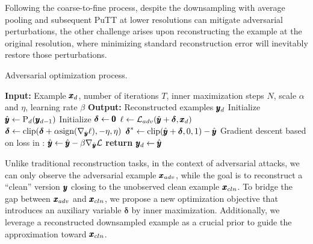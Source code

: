 Following the coarse-to-fine process, despite the downsampling with average pooling and subsequent PuTT at lower resolutions can mitigate adversarial perturbations, the other challenge arises upon reconstructing the example at the original resolution, where minimizing standard reconstruction error will inevitably restore those perturbations.

\begin{table}[t]
\centering
\vskip -0.1in
\begin{minipage}{\linewidth}
\begin{algorithm}[H]
    \caption{Adversarial optimization process.}
    \label{alg:ours}
    \begin{algorithmic}
        \STATE \textbf{Input:} Example $\pmb{x}_d$, number of iterations $T$, inner maximization steps $N$, scale $\alpha$ and $\eta$, learning rate $\beta$
        \STATE \textbf{Output:} Reconstructed examples $\pmb{y}_d$
        \STATE Initialize $\hat{\pmb{y}} \gets \text{P}_{d}(\pmb{y}_{d-1})$
        \STATE Initialize \( \boldsymbol{\delta} \leftarrow \pmb{0} \)
        \STATE $\ell \gets \mathcal{L}_{adv}(\hat{\pmb{y}} + \boldsymbol{\delta}, \pmb{x}_d)$
        \STATE $\boldsymbol{\delta} \gets \text{clip}(\boldsymbol{\delta} + \alpha\text{sign}(\nabla_{\hat{\pmb{y}}}\ell), -\eta, \eta)$
        \ENDFOR
        \STATE $\boldsymbol{\delta}^* \gets \text{clip}(\hat{\pmb{y}}+\boldsymbol{\delta}, 0, 1)-\hat{\pmb{y}}$
        \STATE Gradient descent based on loss in :
        \STATE $\hat{\pmb{y}} \gets \hat{\pmb{y}} - \beta\nabla_{\hat{\pmb{y}}}\mathcal{L}$
        \ENDFOR
        \STATE \textbf{return} $\pmb{y}_d \gets \hat{\pmb{y}}$
    \end{algorithmic}
\end{algorithm}
\end{minipage}
\vskip -0.2in
\end{table}


Unlike traditional reconstruction tasks, in the context of adversarial attacks, we can only observe the adversarial example $\pmb{x}_{adv}$, while the goal is to reconstruct a ``clean'' version $\pmb{y}$ closing to the unobserved clean example $\pmb{x}_{cln}$. To bridge the gap between $\pmb{x}_{adv}$ and $\pmb{x}_{cln}$, we propose a new optimization objective that introduces an auxiliary variable $\boldsymbol{\delta}$ by inner maximization. Additionally, we leverage a reconstructed downsampled example as a crucial prior to guide the approximation toward $\pmb{x}_{cln}$.

